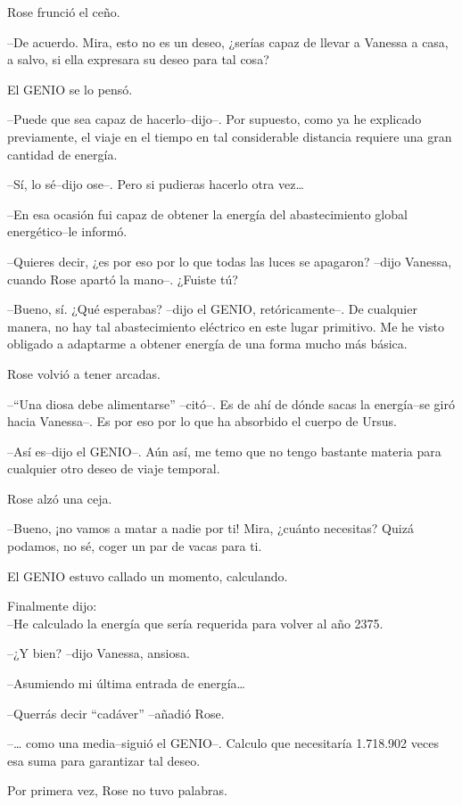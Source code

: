 Rose frunció el ceño.

--De acuerdo. Mira, esto no es un deseo, ¿serías capaz de llevar a
Vanessa a casa, a salvo, si ella expresara su deseo para tal cosa?

El GENIO se lo pensó.

--Puede que sea capaz de hacerlo--dijo--. Por supuesto, como ya he
explicado previamente, el viaje en el tiempo en tal considerable
distancia requiere una gran cantidad de energía.

--Sí, lo sé--dijo ose--. Pero si pudieras hacerlo otra vez\ldots{}

--En esa ocasión fui capaz de obtener la energía del abastecimiento
global energético--le informó.

--Quieres decir, ¿es por eso por lo que todas las luces se apagaron?
--dijo Vanessa, cuando Rose apartó la mano--. ¿Fuiste tú?

--Bueno, sí. ¿Qué esperabas? --dijo el GENIO, retóricamente--. De
cualquier manera, no hay tal abastecimiento eléctrico en este lugar
primitivo. Me he visto obligado a adaptarme a obtener energía de una
forma mucho más básica.

Rose volvió a tener arcadas.

--``Una diosa debe alimentarse'' --citó--. Es de ahí de dónde sacas la
energía--se giró hacia Vanessa--. Es por eso por lo que ha absorbido el
cuerpo de Ursus.

--Así es--dijo el GENIO--. Aún así, me temo que no tengo bastante
materia para cualquier otro deseo de viaje temporal.

Rose alzó una ceja.

--Bueno, ¡no vamos a matar a nadie por ti! Mira, ¿cuánto necesitas?
Quizá podamos, no sé, coger un par de vacas para ti.

El GENIO estuvo callado un momento, calculando.

Finalmente dijo:\\--He calculado la energía que sería requerida para
volver al año 2375.

--¿Y bien? --dijo Vanessa, ansiosa.

--Asumiendo mi última entrada de energía\ldots{}

--Querrás decir ``cadáver'' --añadió Rose.

--\ldots{} como una media--siguió el GENIO--. Calculo que necesitaría
1.718.902 veces esa suma para garantizar tal deseo.

Por primera vez, Rose no tuvo palabras.
